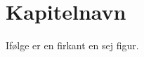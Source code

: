 
\chapter{Kapitelnavn}
\label{chap:funl}

Ifølge \cite{cortes} er en firkant en sej figur. 

\lipsum



\lipsum